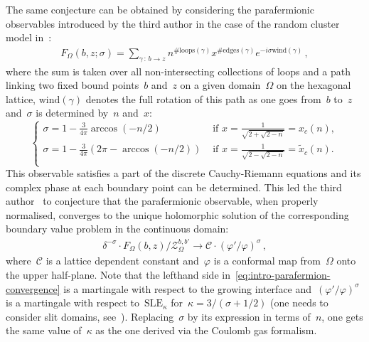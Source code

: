 \documentclass[reqno,11pt,a4paper]{amsart}
\theoremstyle{remark}
\newcommand{\sle}{\mathrm{SLE}}
\newcommand{\loops}{\mathrm{loops}}
\newcommand{\edges}{\mathrm{edges}}
\newcommand{\wind}{\mathrm{wind}}
\def\cZ{\mathcal Z}
\begin{document}
The same conjecture can be obtained by considering the parafermionic observables introduced by the third author in the case of
the random cluster model in~\cite{Smi06,Smi10}:
\begin{align}
\label{eq:intro-fermion}
	F_\Omega(b,z;\sigma) = \sum_{\gamma\,:\,b\to z}{n^{\#\loops(\gamma)}x^{\#\edges(\gamma)}e^{-i\sigma\wind(\gamma)}}\,,
\end{align}
where the sum is taken over all non-intersecting collections of loops and a path linking two fixed bound points~$b$ and~$z$ on a given domain~$\Omega$ on the hexagonal lattice,
$\wind(\gamma)$ denotes the full rotation of this path as one goes from~$b$ to~$z$ and~$\sigma$ is determined by~$n$ and~$x$:
\[
	\begin{cases}
		\sigma = 1 - \tfrac{3}{4\pi}\arccos(-n/2) & \text{ if } x = \tfrac{1}{\sqrt{2+\sqrt{2-n}}} = x_c(n),\\
		\sigma = 1 - \tfrac{3}{4\pi} (2\pi-\arccos(-n/2)) & \text{ if } x = \tfrac{1}{\sqrt{2-\sqrt{2-n}}} = \tilde{x}_c(n).\\
	\end{cases}
\]
This observable satisfies a part of the discrete Cauchy-Riemann equations and its complex phase at each boundary point can be determined.
This led the third author~\cite{Smi06} to conjecture that the parafermionic observable, when properly normalised, converges to the unique holomorphic solution of the corresponding boundary value problem in the continuous domain:
\begin{align}
\label{eq:intro-parafermion-convergence}
\delta^{-\sigma}\cdot F_\Omega(b,z)/\cZ_\Omega^{b,b'} \to \mathcal{C}\cdot (\varphi'/\varphi)^\sigma\,,
\end{align}
where~$\mathcal{C}$ is a lattice dependent constant and~$\varphi$ is a conformal map from~$\Omega$ onto the upper half-plane.
Note that the lefthand side in~\eqref{eq:intro-parafermion-convergence} is a martingale with respect to the growing interface and~$ (\varphi'/\varphi)^\sigma$ is a martingale with respect to~$\sle_\kappa$ for~$\kappa = 3/(\sigma + 1/2)$ (one needs to consider slit domains, see~\cite{Smi06}).
Replacing~$\sigma$ by its expression in terms of~$n$, one gets the same value of~$\kappa$ as the one derived via the Coulomb gas formalism.
\end{document}
